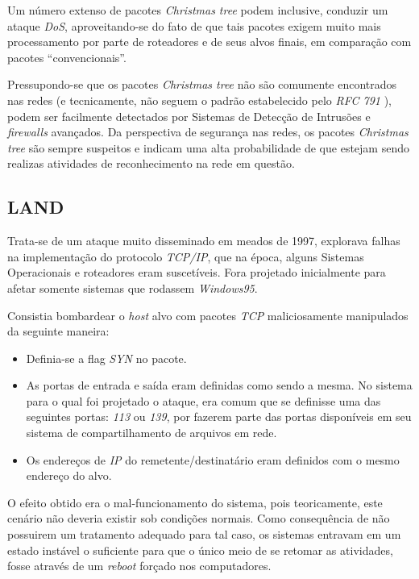 Um número extenso de pacotes \textit{Christmas tree} podem inclusive, conduzir um ataque \textit{DoS}, aproveitando-se do fato de que tais pacotes exigem muito mais processamento por parte de roteadores e de seus alvos finais, em comparação com pacotes ``convencionais''.

Pressupondo-se que os pacotes \textit{Christmas tree} não são comumente encontrados nas redes (e tecnicamente, não seguem o padrão estabelecido pelo \textit{RFC 791} \cite{RFC791}), podem ser facilmente detectados por Sistemas de Detecção de Intrusões e \textit{firewalls} avançados. Da perspectiva de segurança nas redes, os pacotes \textit{Christmas tree} são sempre suspeitos e indicam uma alta probabilidade de que estejam sendo realizas atividades de reconhecimento na rede em questão.


\subsection{LAND}

Trata-se de um ataque muito disseminado em meados de 1997, explorava falhas na implementação do protocolo \textit{TCP/IP}, que na época, alguns Sistemas Operacionais e roteadores eram suscetíveis. Fora projetado inicialmente para afetar somente sistemas que rodassem \textit{Windows95}. \cite{TheLand}

Consistia bombardear o \textit{host} alvo com pacotes \textit{TCP} maliciosamente manipulados da seguinte maneira:

\begin{itemize}
    \item Definia-se a flag \textit{SYN} no pacote.
    \item As portas de entrada e saída eram definidas como sendo a mesma. No sistema para o qual foi projetado o ataque, era comum que se definisse uma das seguintes portas: \textit{113} ou \textit{139}, por fazerem parte das portas disponíveis em seu sistema de compartilhamento de arquivos em rede.
    \item Os endereços de \textit{IP} do remetente/destinatário eram definidos com o mesmo endereço do alvo.
\end{itemize}

O efeito obtido era o mal-funcionamento do sistema, pois teoricamente, este cenário não deveria existir sob condições normais. Como consequência de não possuirem um tratamento adequado para tal caso, os sistemas entravam em um estado instável o suficiente para que o único meio de se retomar as atividades, fosse através de um \textit{reboot} forçado nos computadores.

